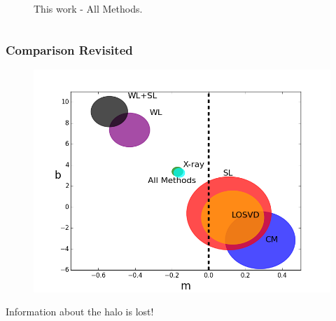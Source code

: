 \documentclass[hyperref={pdfpagelabels=false}]{beamer}
\begin{document}
\begin{frame}
\begin{columns}
\begin{column}{0.5\textwidth}
\begin{figure}
        \caption{This work - All Methods.}
      \end{figure}
    \end{column}
  \end{columns}
\end{frame}

\begin{frame}
  \frametitle{Comparison Revisited}
  \begin{figure}
    \includegraphics[width=\textwidth]{fit_comparison.png}
  \end{figure}

\centerline{Information about the halo is lost!}

\end{frame}
\end{document}
